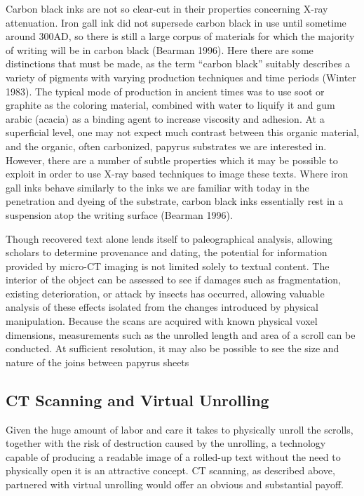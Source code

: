 \documentclass[12pt]{article}
\begin{document}
Carbon black inks are not so clear-cut in their properties concerning X-ray attenuation. Iron gall ink did not supersede carbon black in use until sometime around 300AD, so there is still a large corpus of materials for which the majority of writing will be in carbon black (Bearman 1996). Here there are some distinctions that must be made, as the term ``carbon black'' suitably describes a variety of pigments with varying production techniques and time periods (Winter 1983). The typical mode of production in ancient times was to use soot or graphite as the coloring material, combined with water to liquify it and gum arabic (acacia) as a binding agent to increase viscosity and adhesion. At a superficial level, one may not expect much contrast between this organic material, and the organic, often carbonized, papyrus substrates we are interested in. However, there are a number of subtle properties which it may be possible to exploit in order to use X-ray based techniques to image these texts. Where iron gall inks behave similarly to the inks we are familiar with today in the penetration and dyeing of the substrate, carbon black inks essentially rest in a suspension atop the writing surface (Bearman 1996).

Though recovered text alone lends itself to paleographical analysis, allowing scholars to determine provenance and dating, the potential for information provided by micro-CT imaging is not limited solely to textual content. The interior of the object can be assessed to see if damages such as fragmentation, existing deterioration, or attack by insects has occurred, allowing valuable analysis of these effects isolated from the changes introduced by physical manipulation. Because the scans are acquired with known physical voxel dimensions, measurements such as the unrolled length and area of a scroll can be conducted. At sufficient resolution, it may also be possible to see the size and nature of the joins between papyrus sheets

\subsection*{CT Scanning and Virtual Unrolling}

Given the huge amount of labor and care it takes to physically unroll the scrolls, together with the risk of destruction caused by the unrolling, a technology capable of producing a readable image of a rolled-up text without the need to physically open it is an attractive concept. CT scanning, as described above, partnered with virtual unrolling would offer an obvious and substantial payoff. 
\end{document}
